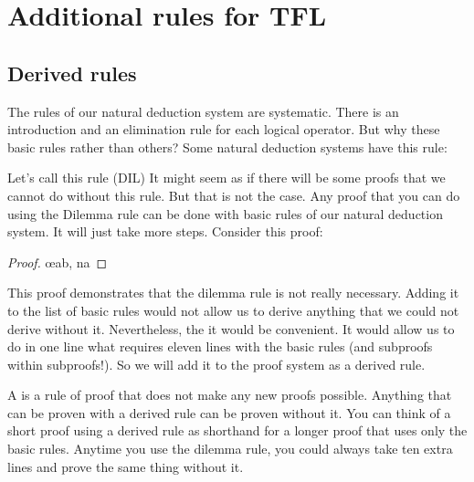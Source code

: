 \graphicspath{{figures--proofs/}}


\chapter{Additional rules for TFL}\label{s:Further}

\section{Derived rules}
The rules of our natural deduction system are systematic. There is an introduction and an elimination rule for each logical operator. But why these basic rules rather than others? Some natural deduction systems have this rule:

Let's call this rule  (DIL) It might seem as if there will be some proofs that we cannot do without this rule. But that is not the case. Any proof that you can do using the Dilemma rule can be done with basic rules of our natural deduction system. It will just take more steps. Consider this proof:

\begin{proof}
	 
	 
	\open
		\open
			 
		\close
		\open
		\close
		\oe{ab, na}
	\close
	 
\end{proof}

This proof demonstrates that the dilemma rule is not really necessary. Adding it to the list of basic rules would not allow us to derive anything that we could not derive without it.
Nevertheless, the it would be convenient. It would allow us to do in one line what requires eleven lines with the basic rules (and subproofs within subproofs!). So we will add it to the proof system as a derived rule.

A  is a rule of proof that does not make any new proofs possible. Anything that can be proven with a derived rule can be proven without it. You can think of a short proof using a derived rule as shorthand for a longer proof that uses only the basic rules. Anytime you use the dilemma rule, you could always take ten extra lines and prove the same thing without it.

